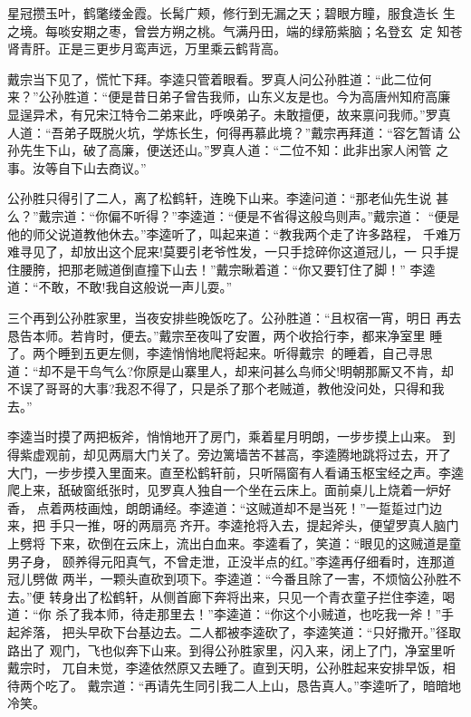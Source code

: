 星冠攒玉叶，鹤氅缕金霞。长髯广颊，修行到无漏之天；碧眼方瞳，服食造长
生之境。每啖安期之枣，曾尝方朔之桃。气满丹田，端的绿筋紫脑；名登玄，定
知苍肾青肝。正是三更步月鸾声远，万里乘云鹤背高。

戴宗当下见了，慌忙下拜。李逵只管着眼看。罗真人问公孙胜道：“此二位何
来？”公孙胜道：“便是昔日弟子曾告我师，山东义友是也。今为高唐州知府高廉
显逞异术，有兄宋江特令二弟来此，呼唤弟子。未敢擅便，故来禀问我师。”罗真
人道：“吾弟子既脱火坑，学炼长生，何得再慕此境？”戴宗再拜道：“容乞暂请
公孙先生下山，破了高廉，便送还山。”罗真人道：“二位不知：此非出家人闲管
之事。汝等自下山去商议。”

公孙胜只得引了二人，离了松鹤轩，连晚下山来。李逵问道：“那老仙先生说
甚么？”戴宗道：“你偏不听得？”李逵道：“便是不省得这般鸟则声。”戴宗道：
“便是他的师父说道教他休去。”李逵听了，叫起来道：“教我两个走了许多路程，
千难万难寻见了，却放出这个屁来!莫要引老爷性发，一只手捻碎你这道冠儿，一
只手提住腰胯，把那老贼道倒直撞下山去！”戴宗瞅着道：“你又要钉住了脚！”
李逵道：“不敢，不敢!我自这般说一声儿耍。”

三个再到公孙胜家里，当夜安排些晚饭吃了。公孙胜道：“且权宿一宵，明日
再去恳告本师。若肯时，便去。”戴宗至夜叫了安置，两个收拾行李，都来净室里
睡了。两个睡到五更左侧，李逵悄悄地爬将起来。听得戴宗的睡着，自己寻思
道：“却不是干鸟气么?你原是山寨里人，却来问甚么鸟师父!明朝那厮又不肯，却
不误了哥哥的大事?我忍不得了，只是杀了那个老贼道，教他没问处，只得和我去。”

李逵当时摸了两把板斧，悄悄地开了房门，乘着星月明朗，一步步摸上山来。
到得紫虚观前，却见两扇大门关了。旁边篱墙苦不甚高，李逵腾地跳将过去，开了
大门，一步步摸入里面来。直至松鹤轩前，只听隔窗有人看诵玉枢宝经之声。李逵
爬上来，舐破窗纸张时，见罗真人独自一个坐在云床上。面前桌儿上烧着一炉好香，
点着两枝画烛，朗朗诵经。李逵道：“这贼道却不是当死！”一踅踅过门边来，把
手只一推，呀的两扇亮齐开。李逵抢将入去，提起斧头，便望罗真人脑门上劈将
下来，砍倒在云床上，流出白血来。李逵看了，笑道：“眼见的这贼道是童男子身，
颐养得元阳真气，不曾走泄，正没半点的红。”李逵再仔细看时，连那道冠儿劈做
两半，一颗头直砍到项下。李逵道：“今番且除了一害，不烦恼公孙胜不去。”便
转身出了松鹤轩，从侧首廊下奔将出来，只见一个青衣童子拦住李逵，喝道：“你
杀了我本师，待走那里去！”李逵道：“你这个小贼道，也吃我一斧！”手起斧落，
把头早砍下台基边去。二人都被李逵砍了，李逵笑道：“只好撒开。”径取路出了
观门，飞也似奔下山来。到得公孙胜家里，闪入来，闭上了门，净室里听戴宗时，
兀自未觉，李逵依然原又去睡了。直到天明，公孙胜起来安排早饭，相待两个吃了。
戴宗道：“再请先生同引我二人上山，恳告真人。”李逵听了，暗暗地冷笑。


